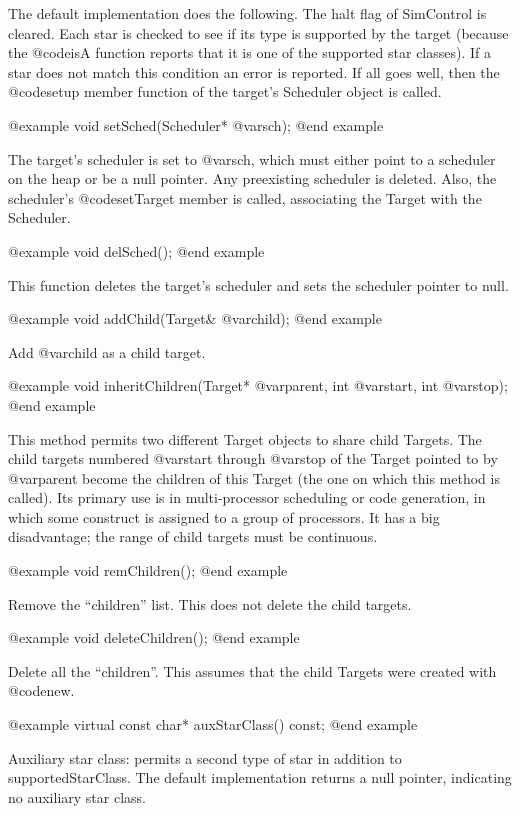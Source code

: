 The default implementation does the following.  The halt flag of
SimControl is cleared.  Each star is checked to see if its type is
supported by the target (because the @code{isA} function reports
that it is one of the supported star classes).  If a star does not
match this condition an error is reported.  If all goes well, then
the @code{setup} member function of the target's Scheduler object
is called.

@example
void setSched(Scheduler* @var{sch});
@end example

The target's scheduler is set to @var{sch}, which must either point to a
scheduler on the heap or be a null pointer.  Any preexisting scheduler
is deleted.  Also, the scheduler's @code{setTarget} member is called,
associating the Target with the Scheduler.

@example
void delSched();
@end example

This function deletes the target's scheduler and sets the scheduler
pointer to null.

@example
void addChild(Target& @var{child});
@end example

Add @var{child} as a child target.

@example
void inheritChildren(Target* @var{parent}, int @var{start}, int @var{stop});
@end example

This method permits two different Target objects to share child Targets.
The child targets numbered @var{start} through @var{stop} of the Target
pointed to by @var{parent} become the children of this Target (the one
on which this method is called).  Its primary use is in multi-processor
scheduling or code generation, in which some construct is assigned to
a group of processors.  It has a big disadvantage; the range of child
targets must be continuous.

@example
void remChildren();
@end example

Remove the ``children'' list.  This does not delete the child targets.

@example
void deleteChildren();
@end example

Delete all the ``children''.  This assumes that the child Targets
were created with @code{new}.

@example
virtual const char* auxStarClass() const;
@end example

Auxiliary star class: permits a second type of star in addition
to supportedStarClass.  The default implementation returns a
null pointer, indicating no auxiliary star class.

